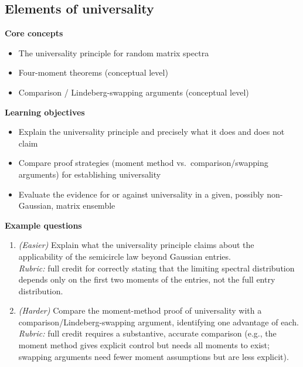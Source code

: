 \documentclass[11pt]{article}
\begin{document}
\subsection{Elements of universality}
\textbf{Core concepts}
\begin{itemize}[nosep]
\item The universality principle for random matrix spectra
\item Four-moment theorems (conceptual level)
\item Comparison / Lindeberg-swapping arguments (conceptual level)
\end{itemize}
\textbf{Learning objectives}
\begin{itemize}[nosep]
\item Explain the universality principle and precisely what it does and does not claim
\item Compare proof strategies (moment method vs.\ comparison/swapping arguments) for establishing universality
\item Evaluate the evidence for or against universality in a given, possibly non-Gaussian, matrix ensemble
\end{itemize}
\textbf{Example questions}
\begin{enumerate}[nosep]
\item \emph{(Easier)} Explain what the universality principle claims about the applicability of the semicircle law beyond Gaussian entries. \\
\emph{Rubric:} full credit for correctly stating that the limiting spectral distribution depends only on the first two moments of the entries, not the full entry distribution.
\item \emph{(Harder)} Compare the moment-method proof of universality with a comparison/Lindeberg-swapping argument, identifying one advantage of each. \\
\emph{Rubric:} full credit requires a substantive, accurate comparison (e.g., the moment method gives explicit control but needs all moments to exist; swapping arguments need fewer moment assumptions but are less explicit).
\end{enumerate}
\end{document}
